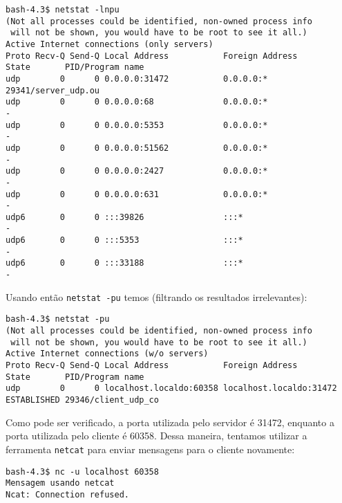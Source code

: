 \documentclass[a4paper,10pt]{article}
\begin{document}
\begin{lstlisting}
bash-4.3$ netstat -lnpu
(Not all processes could be identified, non-owned process info
 will not be shown, you would have to be root to see it all.)
Active Internet connections (only servers)
Proto Recv-Q Send-Q Local Address           Foreign Address         State       PID/Program name
udp        0      0 0.0.0.0:31472           0.0.0.0:*                           29341/server_udp.ou
udp        0      0 0.0.0.0:68              0.0.0.0:*                           -               
udp        0      0 0.0.0.0:5353            0.0.0.0:*                           -               
udp        0      0 0.0.0.0:51562           0.0.0.0:*                           -               
udp        0      0 0.0.0.0:2427            0.0.0.0:*                           -               
udp        0      0 0.0.0.0:631             0.0.0.0:*                           -               
udp6       0      0 :::39826                :::*                                -               
udp6       0      0 :::5353                 :::*                                -               
udp6       0      0 :::33188                :::*                                -               

\end{lstlisting}

Usando então {\tt netstat -pu} temos (filtrando os resultados irrelevantes):

\begin{lstlisting}
bash-4.3$ netstat -pu
(Not all processes could be identified, non-owned process info
 will not be shown, you would have to be root to see it all.)
Active Internet connections (w/o servers)
Proto Recv-Q Send-Q Local Address           Foreign Address         State       PID/Program name
udp        0      0 localhost.localdo:60358 localhost.localdo:31472 ESTABLISHED 29346/client_udp_co

\end{lstlisting}

Como pode ser verificado, a porta utilizada pelo servidor é 31472, enquanto a porta utilizada pelo cliente é 60358. Dessa maneira, tentamos utilizar a ferramenta {\tt netcat} para enviar mensagens para o cliente novamente:

\begin{lstlisting}
bash-4.3$ nc -u localhost 60358
Mensagem usando netcat
Ncat: Connection refused.

\end{lstlisting}
\end{document}
